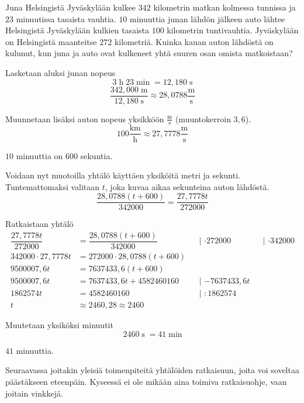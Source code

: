 \begin{esimerkki}
	Juna Helsingistä Jyväskylään kulkee $342$ kilometrin matkan kolmessa tunnissa ja $23$ minuutissa tasaista vauhtia.
	$10$ minuuttia junan lähdön jälkeen auto lähtee Helsingistä Jyväskylään kulkien tasaista $100$ kilometrin tuntivauhtia.
	Jyväskylään on Helsingistä maanteitse $272$ kilometriä.
	Kuinka kauan auton lähdöstä on kulunut, kun juna ja auto ovat kulkeneet yhtä suuren osan omista matkoistaan?
	\begin{esimratk}
		Lasketaan aluksi junan nopeus
		\[ 3 \; \text{h} \; 23 \; \text{min} \; = 12,180 \; \text{s} \]
		\[ \dfrac{342,000 \; \text{m}}{12,180 \; \text{s}} \approx  28,0788 \frac{\text{m}}{\text{s}} \]
		
		Muunnetaan lisäksi auton nopeus yksikköön $\frac{\text{m}}{\text{s}}$ (muuntokerroin $3,6$).
		\[ 100 \frac{\text{km}}{\text{h}} \approx 27,7778 \frac{\text{m}}{\text{s}} \]
		
		$10$ minuuttia on $600$ sekuntia.
		
		Voidaan nyt muotoilla yhtälö käyttäen yksiköitä metri ja sekunti. Tuntemattomaksi valitaan $t$, joka kuvaa aikaa sekunteina auton lähdöstä.
		\[ \dfrac{28,0788(t+600)}{342000} = \dfrac{27,7778t}{272000} \]
		
		Ratkaistaan yhtälö
		\begin{align*}
			\dfrac{27,7778t}{272000} &= \dfrac{28,0788(t+600)}{342000} &&\text{| $\cdot{272000}$} &&\text{| $\cdot{342000}$}  \\
			342000 \cdot 27,7778t &= 272000 \cdot 28,0788(t+600) \\
			9500007,6t &= 7637433,6(t+600) \\
			9500007,6t &= 7637433,6t + 4582460160 &&\text{| $-7637433,6t$} \\ 
			1862574t &= 4582460160 &&\text{| $:{1862574}$} \\
			t &\approx 2460,28 \approx 2460
		\end{align*}
		
		Muutetaan yksiköksi minuutit
		\[ 2460 \; \text{s} \; = 41 \; \text{min} \]
	\end{esimratk}
	\begin{esimvast}
		$41$ minuuttia.
	\end{esimvast}
\end{esimerkki}


Seuraavassa joitakin yleisiä toimenpiteitä yhtälöiden ratkaisuun, joita voi soveltaa päästäkseen eteenpäin. Kyseessä ei ole mikään aina toimiva
ratkaisuohje, vaan joitain vinkkejä.



